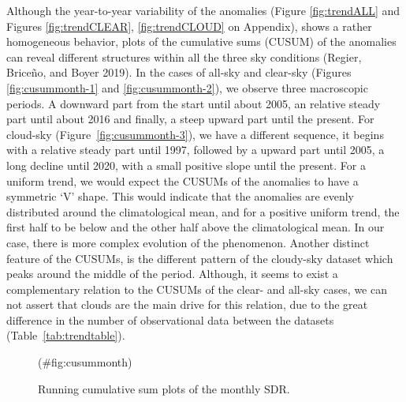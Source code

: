 \documentclass[
  preprint, 3p, authoryear]{article}
\begin{document}
Although the year-to-year variability of the anomalies (Figure \ref{fig:trendALL} and Figures \ref{fig:trendCLEAR}, \ref{fig:trendCLOUD} on Appendix), shows a rather homogeneous behavior, plots of the cumulative sums (CUSUM) of the anomalies can reveal different structures within all the three sky conditions (Regier, Briceño, and Boyer 2019).
In the cases of all-sky and clear-sky (Figures \ref{fig:cusummonth-1} and \ref{fig:cusummonth-2}), we observe three macroscopic periods.
A downward part from the start until about 2005, an relative steady part until about 2016 and finally, a steep upward part until the present.
For cloud-sky (Figure~\ref{fig:cusummonth-3}), we have a different sequence, it begins with a relative steady part until 1997, followed by a upward part until 2005, a long decline until 2020, with a small positive slope until the present.
For a uniform trend, we would expect the CUSUMs of the anomalies to have a symmetric `V' shape.
This would indicate that the anomalies are evenly distributed around the climatological mean, and for a positive uniform trend, the first half to be below and the other half above the climatological mean.
In our case, there is more complex evolution of the phenomenon.
Another distinct feature of the CUSUMs, is the different pattern of the cloudy-sky dataset which peaks around the middle of the period.
Although, it seems to exist a complementary relation to the CUSUMs of the clear- and all-sky cases, we can not assert that clouds are the main drive for this relation, due to the great difference in the number of observational data between the datasets (Table~\ref{tab:trendtable}).

\begin{figure}[h!]

{\centering {}

}

\caption{Running cumulative sum plots of the monthly SDR.}(\#fig:cusummonth)
\end{figure}
\end{document}
